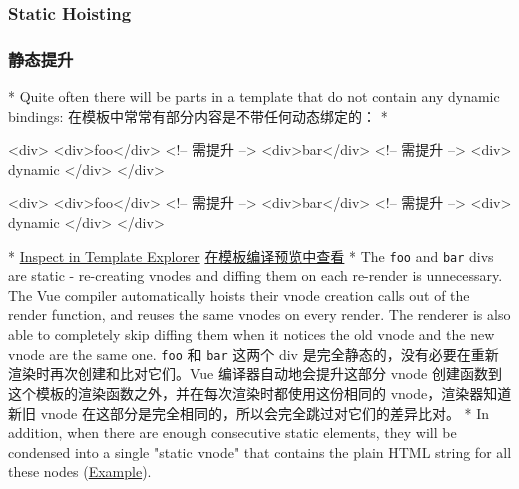\begin{paracol}{2}
\subsubsection{Static Hoisting}
\switchcolumn
\subsubsection{静态提升}
\switchcolumn[0]*%
Quite often there will be parts in a template that do not contain any
dynamic bindings:
\switchcolumn
在模板中常常有部分内容是不带任何动态绑定的：
\switchcolumn[0]*%
\begin{codeHtml}
<div>
  <div>foo</div> <!-- 需提升 -->
  <div>bar</div> <!-- 需提升 -->
  <div>{{ dynamic }}</div>
</div>
\end{codeHtml}
\switchcolumn
\begin{codeHtml}
<div>
  <div>foo</div> <!-- 需提升 -->
  <div>bar</div> <!-- 需提升 -->
  <div>{{ dynamic }}</div>
</div>
\end{codeHtml}
\switchcolumn[0]*%
\href{https://template-explorer.vuejs.org/\#eyJzcmMiOiI8ZGl2PlxuICA8ZGl2PmZvbzwvZGl2PiA8IS0tIGhvaXN0ZWQgLS0+XG4gIDxkaXY+YmFyPC9kaXY+IDwhLS0gaG9pc3RlZCAtLT5cbiAgPGRpdj57eyBkeW5hbWljIH19PC9kaXY+XG48L2Rpdj5cbiIsIm9wdGlvbnMiOnsiaG9pc3RTdGF0aWMiOnRydWV9fQ==}{Inspect
in Template Explorer}
\switchcolumn
\href{https://template-explorer.vuejs.org/\#eyJzcmMiOiI8ZGl2PlxuICA8ZGl2PmZvbzwvZGl2PiA8IS0tIGhvaXN0ZWQgLS0+XG4gIDxkaXY+YmFyPC9kaXY+IDwhLS0gaG9pc3RlZCAtLT5cbiAgPGRpdj57eyBkeW5hbWljIH19PC9kaXY+XG48L2Rpdj5cbiIsIm9wdGlvbnMiOnsiaG9pc3RTdGF0aWMiOnRydWV9fQ==}{在模板编译预览中查看}
\switchcolumn[0]*%
The \texttt{foo} and \texttt{bar} divs are static - re-creating vnodes
and diffing them on each re-render is unnecessary. The Vue compiler
automatically hoists their vnode creation calls out of the render
function, and reuses the same vnodes on every render. The renderer is
also able to completely skip diffing them when it notices the old vnode
and the new vnode are the same one.
\switchcolumn
\texttt{foo} 和 \texttt{bar} 这两个 div
是完全静态的，没有必要在重新渲染时再次创建和比对它们。Vue
编译器自动地会提升这部分 vnode
创建函数到这个模板的渲染函数之外，并在每次渲染时都使用这份相同的
vnode，渲染器知道新旧 vnode
在这部分是完全相同的，所以会完全跳过对它们的差异比对。
\switchcolumn[0]*%
In addition, when there are enough consecutive static elements, they
will be condensed into a single "static vnode" that contains the plain
HTML string for all these nodes
(\href{https://template-explorer.vuejs.org/\#eyJzcmMiOiI8ZGl2PlxuICA8ZGl2IGNsYXNzPVwiZm9vXCI+Zm9vPC9kaXY+XG4gIDxkaXYgY2xhc3M9XCJmb29cIj5mb288L2Rpdj5cbiAgPGRpdiBjbGFzcz1cImZvb1wiPmZvbzwvZGl2PlxuICA8ZGl2IGNsYXNzPVwiZm9vXCI+Zm9vPC9kaXY+XG4gIDxkaXYgY2xhc3M9XCJmb29cIj5mb288L2Rpdj5cbiAgPGRpdj57eyBkeW5hbWljIH19PC9kaXY+XG48L2Rpdj4iLCJzc3IiOmZhbHNlLCJvcHRpb25zIjp7ImhvaXN0U3RhdGljIjp0cnVlfX0=}{Example}).

\end{paracol}
